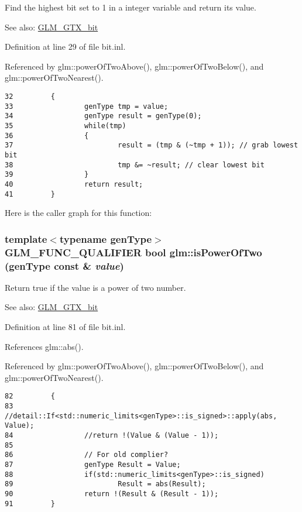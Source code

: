 Find the highest bit set to 1 in a integer variable and return its value. \begin{Desc}
\item[See also:]\hyperlink{group__gtx__bit}{GLM\_\-GTX\_\-bit} \end{Desc}


Definition at line 29 of file bit.inl.

Referenced by glm::powerOfTwoAbove(), glm::powerOfTwoBelow(), and glm::powerOfTwoNearest().

\begin{Code}\begin{verbatim}32         {
33                 genType tmp = value;
34                 genType result = genType(0);
35                 while(tmp)
36                 {
37                         result = (tmp & (~tmp + 1)); // grab lowest bit
38                         tmp &= ~result; // clear lowest bit
39                 }
40                 return result;
41         }
\end{verbatim}
\end{Code}




Here is the caller graph for this function:\hypertarget{group__gtx__bit_g2b12722968dabd423334391d1fd42acd}{
\subsubsection[isPowerOfTwo]{\setlength{\rightskip}{0pt plus 5cm}template$<$typename genType$>$ GLM\_\-FUNC\_\-QUALIFIER bool glm::isPowerOfTwo (genType const \& {\em value})}}
\label{group__gtx__bit_g2b12722968dabd423334391d1fd42acd}


Return true if the value is a power of two number. \begin{Desc}
\item[See also:]\hyperlink{group__gtx__bit}{GLM\_\-GTX\_\-bit} \end{Desc}


Definition at line 81 of file bit.inl.

References glm::abs().

Referenced by glm::powerOfTwoAbove(), glm::powerOfTwoBelow(), and glm::powerOfTwoNearest().

\begin{Code}\begin{verbatim}82         {
83                 //detail::If<std::numeric_limits<genType>::is_signed>::apply(abs, Value);
84                 //return !(Value & (Value - 1));
85 
86                 // For old complier?
87                 genType Result = Value;
88                 if(std::numeric_limits<genType>::is_signed)
89                         Result = abs(Result);
90                 return !(Result & (Result - 1));
91         }
\end{verbatim}
\end{Code}




